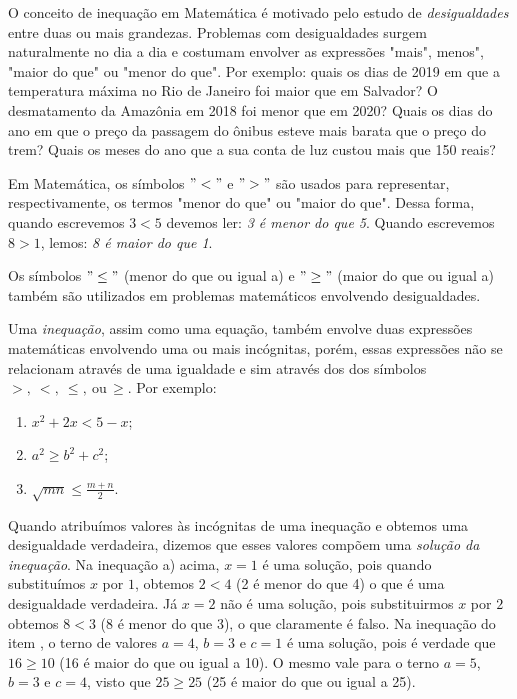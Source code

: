 \label{\detokenize{AF107-6:inequacoes}}\label{\detokenize{AF107-6::doc}}

O conceito de inequação em Matemática é motivado pelo estudo de \emph{desigualdades} entre duas ou mais grandezas. Problemas com desigualdades surgem naturalmente no dia a dia e costumam envolver as expressões "mais", menos", "maior do que"{} ou "menor do que". Por exemplo: quais os dias de 2019 em que a temperatura máxima no Rio de Janeiro foi maior que em Salvador? O desmatamento da Amazônia em 2018 foi menor que em 2020? Quais os dias do ano em que o preço da passagem do ônibus esteve mais barata que o preço do trem? Quais os meses do ano que a sua conta de luz custou mais que 150 reais? 

Em Matemática, os símbolos $"<"$ e $">"$ são usados para representar, respectivamente, os termos "menor do que"{} ou "maior do que". Dessa forma, quando escrevemos $3<5$ devemos ler: \emph{3 é menor do que 5}. Quando escrevemos $8 > 1$, lemos: \emph{8 é maior do que 1}.

Os símbolos $"\leq"$ (menor do que ou igual a) e $"\geq"$ (maior do que ou igual a) também são utilizados em problemas matemáticos envolvendo desigualdades.

Uma \emph{inequação}, assim como uma equação, também envolve duas expressões matemáticas envolvendo uma ou mais incógnitas, porém, essas expressões não se relacionam através de uma igualdade e sim através dos dos símbolos $>, \ <, \ \leq,\ \mbox{ou} \, \geq$. Por exemplo:
\begin{enumerate}
\item{}
$x^2 + 2x < 5 - x$;

\item{}
$a^2 \geq b^2 + c^2$;

\item{}
$\sqrt{mn} \leq \frac{m+n}{2}.$
\end{enumerate}

Quando atribuímos valores às incógnitas de uma inequação e obtemos uma desigualdade verdadeira, dizemos que esses valores compõem uma \emph{solução da inequação}. Na inequação a) acima, $x = 1$ é uma solução, pois quando substituímos $x$ por $1$, obtemos $2<4$ (2 é menor do que 4) o que é uma desigualdade verdadeira. Já $x = 2$ não é uma solução, pois substituirmos $x$ por $2$ obtemos $8<3$ (8 é menor do que 3), o que claramente é falso. Na inequação do item , o terno de valores $a = 4$, $b=3$ e $c=1$ é uma solução, pois é verdade que $16\geq 10$ (16 é maior do que ou igual a 10). O mesmo vale para o terno $a = 5$, $b = 3$ e $c = 4$, visto que $25 \geq 25$ (25 é maior do que ou igual a 25).

